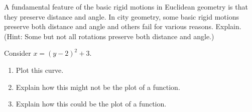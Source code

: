 %
%  
%

\begin{prob}
A fundamental feature of the basic rigid motions in Euclidean geometry is that they preserve distance and angle.  In city geometry, some basic rigid motions preserve both distance and angle and others fail for various reasons.  Explain.  (Hint:  Some but not all rotations preserve both distance and angle.)  
\end{prob}


\begin{prob}
Consider $x=(y-2)^2+3$. 
\begin{enumerate}
\item Plot this curve.  
\item Explain how this might not be the plot of a function.

\item Explain how this could be the plot of a function.
\end{enumerate}
\end{prob}


